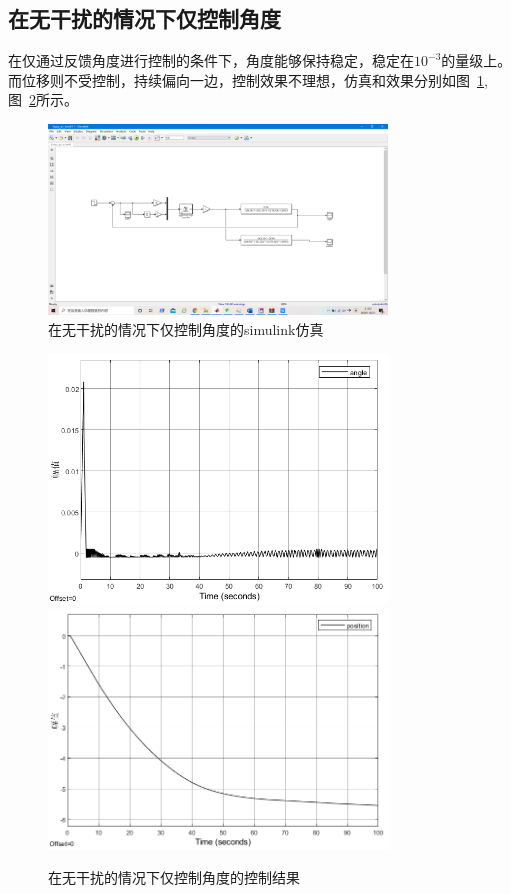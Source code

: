 \subsection{在无干扰的情况下仅控制角度}
在仅通过反馈角度进行控制的条件下，角度能够保持稳定，稳定在$10^{-3}$的量级上。而位移则不受控制，持续偏向一边，控制效果不理想，仿真和效果分别如图~\ref{fig:onlyanglesim},图~\ref{fig:onlyangle}所示。
\begin{figure}[hbpt]
\centering
\includegraphics[width=9cm]{onlyangle1.png}
\caption{在无干扰的情况下仅控制角度的simulink仿真}\label{fig:onlyanglesim}
\end{figure}

\begin{figure}[hbpt]
\centering
\includegraphics[width=9cm]{onlyangle2.png}
\includegraphics[width=9cm]{onlyangle3.png}
\caption{在无干扰的情况下仅控制角度的控制结果}\label{fig:onlyangle}
\end{figure}

